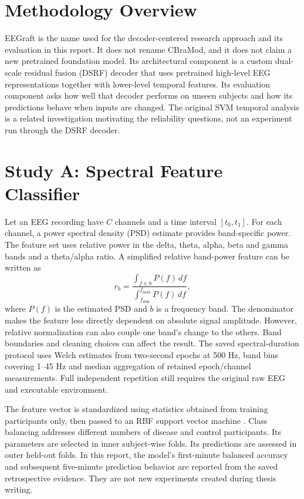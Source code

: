 \section{Methodology Overview}
EEGraft is the name used for the decoder-centered research approach and its evaluation in this report. It does not rename CBraMod, and it does not claim a new pretrained foundation model. Its architectural component is a custom dual-scale residual fusion (DSRF) decoder that uses pretrained high-level EEG representations together with lower-level temporal features. Its evaluation component asks how well that decoder performs on unseen subjects and how its predictions behave when inputs are changed. The original SVM temporal analysis is a related investigation motivating the reliability questions, not an experiment run through the DSRF decoder.

\section{Study A: Spectral Feature Classifier}
Let an EEG recording have $C$ channels and a time interval $[t_0,t_1]$. For each channel, a power spectral density (PSD) estimate provides band-specific power. The feature set uses relative power in the delta, theta, alpha, beta and gamma bands and a theta/alpha ratio. A simplified relative band-power feature can be written as
\begin{equation}
 r_b=\frac{\int_{f\in b} P(f)\,df}{\int_{f_{\min}}^{f_{\max}}P(f)\,df},
 \label{eq:relpower}
\end{equation}
where $P(f)$ is the estimated PSD and $b$ is a frequency band. The denominator makes the feature less directly dependent on absolute signal amplitude. However, relative normalization can also couple one band's change to the others. Band boundaries and cleaning choices can affect the result. The saved spectral-duration protocol uses Welch estimates from two-second epochs at 500 Hz, band bins covering 1--45 Hz and median aggregation of retained epoch/channel measurements. Full independent repetition still requires the original raw EEG and executable environment.

The feature vector is standardized using statistics obtained from training participants only, then passed to an RBF support vector machine \cite{cortes1995}. Class balancing addresses different numbers of disease and control participants. Its parameters are selected in inner subject-wise folds. Its predictions are assessed in outer held-out folds. In this report, the model's first-minute balanced accuracy and subsequent five-minute prediction behavior are reported from the saved retrospective evidence. They are not new experiments created during thesis writing.

